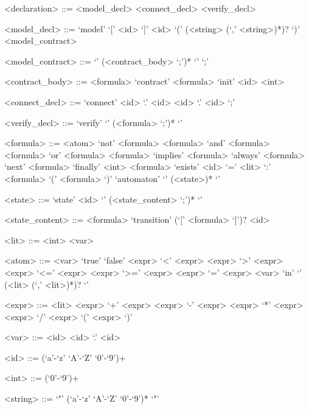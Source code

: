 \begin{grammar}
  <declaration> ::= <model\_decl>
  \alt <connect\_decl>
  \alt <verify\_decl>

  <model\_decl> ::= `model' `[' <id> `]' <id> `(' (<string> (`,' <string>)*)? `)' <model\_contract>

  <model\_contract> ::= `{' (<contract\_body> `;')* `}'
  \alt `;'

  <contract\_body> ::= <formula>
  \alt `contract' <formula>
  \alt `init' <id> <int>

  <connect\_decl> ::= `connect' <id> `.' <id> <id> `.' <id> `;'

  <verify\_decl> ::= `verify' `{' (<formula> `;')* `}'

  <formula> ::= <atom>
  \alt `not' <formula>
  \alt <formula> `and' <formula>
  \alt <formula> `or' <formula>
  \alt <formula> `implies' <formula>
  \alt `always' <formula>
  \alt `next' <formula>
  \alt `finally' <int> <formula>
  \alt `exists' <id> `=' <lit> `:' <formula>
  \alt `(' <formula> `)'
  \alt `automaton' `{' (<state>)* `}'
  
  <state> ::= `state' <id> `{' (<state\_content> `;')* `}'

  <state\_content> ::= <formula>
  \alt `transition' (`[' <formula> `]')? <id>

  <lit> ::= <int>
  \alt <var>

  <atom> ::= <var>
  \alt `true'
  \alt `false'
  \alt <expr> `<' <expr>
  \alt <expr> `>' <expr>
  \alt <expr> `<=' <expr>
  \alt <expr> `>=' <expr>
  \alt <expr> `=' <expr>
  \alt <var> `in' `{' (<lit> (`,' <lit>)*)? `}'

  <expr> ::= <lit>
  \alt <expr> `+' <expr>
  \alt <expr> `-' <expr>
  \alt <expr> `*' <expr>
  \alt <expr> `/' <expr>
  \alt `(' <expr> `)'

  <var> ::= <id>
  \alt <id> `.' <id>
  
  <id> ::= (`a'-`z' `A'-`Z' `0'-`9')+
  
  <int> ::= (`0'-`9')+

  <string> ::= `"' (`a'-`z' `A'-`Z' `0'-`9')* `"'
\end{grammar}
